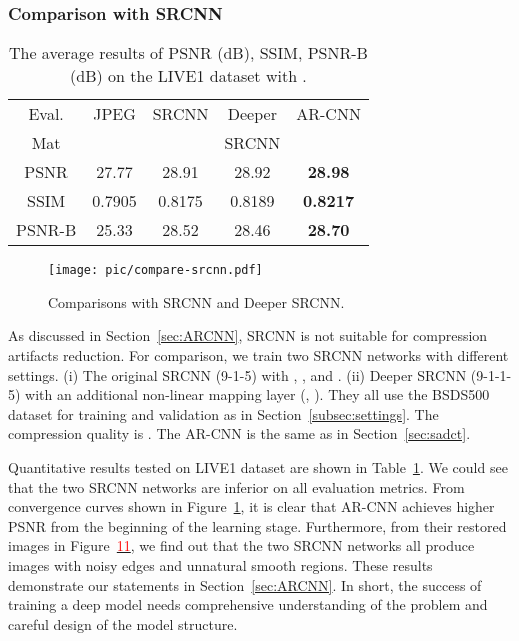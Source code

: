 \documentclass[10pt,twocolumn,letterpaper]{article}
\begin{document}
\subsubsection{Comparison with SRCNN}
\label{sec:exp_SRCNN}

\begin{table}\scriptsize
\caption{The average results of PSNR (dB), SSIM, PSNR-B (dB) on the LIVE1 dataset with  .}\label{tab:srcnn}
\vspace{-0.15cm}
\begin{center}
\begin{tabular}{|c|c|c|c|c|}
\hline
 Eval. & JPEG & SRCNN  & Deeper & AR-CNN \\
 Mat &       &         & SRCNN &    \\

\hline\hline
PSNR  & 27.77 & 28.91 & 28.92 & \textbf{28.98}   \\
\hline
SSIM & 0.7905 & 0.8175 & 0.8189 & \textbf{0.8217}   \\
\hline
PSNR-B  & 25.33 & 28.52 & 28.46 & \textbf{28.70}   \\
\hline
\end{tabular}
\vspace{-0.25cm}
\end{center}
\end{table}

\begin{figure}[t]\small
\begin{center}
 \texttt{[image: pic/compare-srcnn.pdf]}
\caption{Comparisons with SRCNN and Deeper SRCNN.}
\label{fig:srcnn}
\vspace{-0.75cm}
\end{center}
\end{figure}

As discussed in Section~\ref{sec:ARCNN}, SRCNN is not suitable for compression artifacts reduction. For comparison, we train two SRCNN networks with different settings.
(i) The original SRCNN (9-1-5) with , ,  and . (ii) Deeper SRCNN (9-1-1-5) with an additional non-linear mapping layer (, ).
They all use the BSDS500 dataset for training and validation as in Section~\ref{subsec:settings}. The compression quality is . The AR-CNN is the same as in Section~\ref{sec:sadct}.

Quantitative results tested on LIVE1 dataset are shown in Table~\ref{tab:srcnn}. We could see that the two SRCNN networks are inferior on all evaluation metrics. From convergence curves shown in Figure~\ref{fig:srcnn}, it is clear that AR-CNN achieves higher PSNR from the beginning of the learning stage.
Furthermore, from their restored images in Figure~\hyperlink{page.8}{\textcolor{red}{11}}, we find out that the two SRCNN networks all produce images with noisy edges and unnatural smooth regions.
These results demonstrate our statements in Section~\ref{sec:ARCNN}. In short, the success of training a deep model needs comprehensive understanding of the problem and careful design of the model structure.
\end{document}

